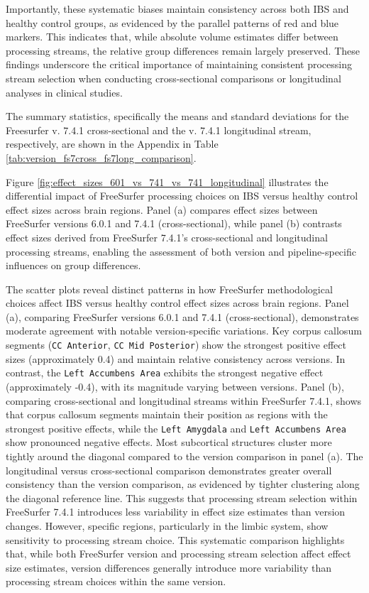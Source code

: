 \documentclass[diagnostics,article,accept,pdftex,moreauthors]{Definitions/mdpi}
\begin{document}
Importantly, these systematic biases maintain consistency across both IBS and healthy control groups, as evidenced by the parallel patterns of red and blue markers. This indicates that, while absolute volume estimates differ between processing streams, the relative group differences remain largely preserved. These findings underscore the critical importance of maintaining consistent processing stream selection when conducting cross-sectional comparisons or longitudinal analyses in clinical studies.

 The summary statistics, specifically the means and standard deviations for the Freesurfer v. 7.4.1 cross-sectional and the v. 7.4.1 longitudinal stream, respectively, are shown in the Appendix in Table \ref{tab:version_fs7cross_fs7long_comparison}.


Figure \ref{fig:effect_sizes_601_vs_741_vs_741_longitudinal} illustrates the differential impact of FreeSurfer processing choices on IBS versus healthy control effect sizes across brain regions. {Panel (a)} 
compares effect sizes between FreeSurfer versions 6.0.1 and 7.4.1 (cross-sectional), while panel (b) contrasts effect sizes derived from FreeSurfer 7.4.1's cross-sectional and longitudinal processing streams, enabling the assessment of both version and pipeline-specific influences on group differences.



The scatter plots reveal distinct patterns in how FreeSurfer methodological choices affect IBS versus healthy control effect sizes across brain regions. Panel (a), comparing FreeSurfer versions 6.0.1 and 7.4.1 (cross-sectional), demonstrates moderate agreement with notable version-specific variations. Key corpus callosum segments (\texttt{CC Anterior}, \texttt{CC Mid Posterior}) show the strongest positive effect sizes (approximately 0.4) and maintain relative consistency across versions. In contrast, the \texttt{Left Accumbens Area} exhibits the strongest negative effect (approximately -0.4), with its magnitude varying between versions. Panel (b), comparing cross-sectional and longitudinal streams within FreeSurfer 7.4.1, shows that corpus callosum segments maintain their position as regions with the strongest positive effects, while the \texttt{Left Amygdala} and \texttt{Left Accumbens Area} show pronounced negative effects. Most subcortical structures cluster more tightly around the diagonal compared to the version comparison in panel (a). The longitudinal versus cross-sectional comparison demonstrates greater overall consistency than the version comparison, as evidenced by tighter clustering along the diagonal reference line. This suggests that processing stream selection within FreeSurfer 7.4.1 introduces less variability in effect size estimates than version changes. However, specific regions, particularly in the limbic system, show sensitivity to processing stream choice. This systematic comparison highlights that, while both FreeSurfer version and processing stream selection affect effect size estimates, version differences generally introduce more variability than processing stream choices within the same version.
\end{document}
